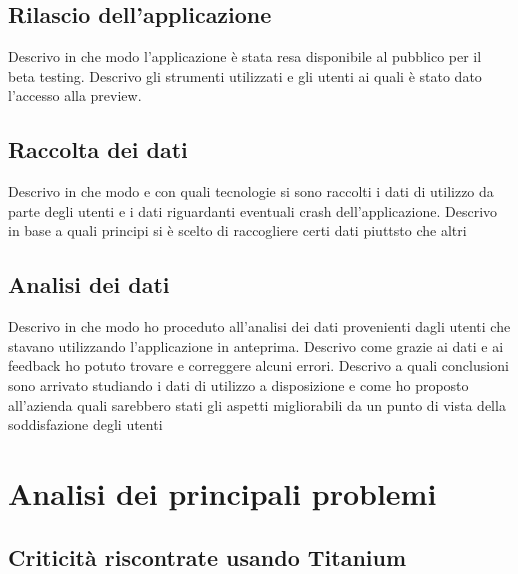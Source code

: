 		\subsection{Rilascio dell'applicazione}
			Descrivo in che modo l'applicazione è stata resa disponibile al pubblico per il beta testing. Descrivo gli strumenti
			utilizzati e gli utenti ai quali è stato dato l'accesso alla preview.
		\subsection{Raccolta dei dati}
			Descrivo in che modo e con quali tecnologie si sono raccolti i dati di utilizzo da parte degli utenti e i dati riguardanti
			eventuali crash dell'applicazione. Descrivo in base a quali principi si è scelto di raccogliere certi dati piuttsto che altri
		\subsection{Analisi dei dati}
			Descrivo in che modo ho proceduto all'analisi dei dati provenienti dagli utenti che stavano utilizzando l'applicazione in
			anteprima. Descrivo come grazie ai dati e ai feedback ho potuto trovare e correggere alcuni errori. Descrivo a quali
			conclusioni sono arrivato studiando i dati di utilizzo a disposizione e come ho proposto all'azienda quali sarebbero stati
			gli aspetti migliorabili da un punto di vista della soddisfazione degli utenti
	\section{Analisi dei principali problemi}
		\subsection{Criticità riscontrate usando Titanium}

